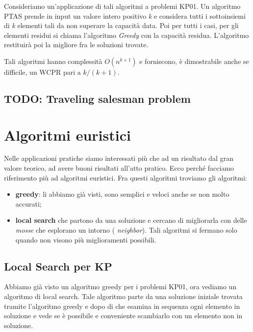 \documentclass[11pt, oneside]{book}
\begin{document}
\par\bigskip

Consideriamo un'applicazione di tali algoritmi a problemi KP01. Un
algoritmo PTAS prende in input un valore intero positivo {\em k} e
considera tutti i sottoinsiemi di {\em k} elementi tali da non
superare la capacit\`a data. Poi per tutti i casi, per gli elementi
residui si chiama l'algoritmo {\em Greedy} con la capacit\`a
residua. L'algoritmo restituir\`a poi la migliore fra le soluzioni
trovate.

\par\bigskip

Tali algoritmi hanno complessit\`a $O(n^{k+1})$ e forniscono, \`e
dimostrabile anche se difficile, un WCPR pari a $k/(k+1)$.
 
\subsection*{TODO: Traveling salesman problem}

\section{Algoritmi euristici}

Nelle applicazioni pratiche siamo interessati pi\`u che ad un
risultato dal gran valore teorico, ad avere buoni risultati all'atto
pratico. Ecco perch\'e facciamo riferimento pi\`u ad algoritmi
euristici. Fra questi algoritmi troviamo gli algoritmi:

\begin{itemize}

\item {\bf greedy}: li abbiamo gi\`a visti, sono semplici e veloci
  anche se non molto accurati;
  
\item {\bf local search} che partono da una soluzione e cercano di
  migliorarla con delle {\em mosse} che esplorano un intorno ({\em
    neighbor}). Tali algoritmi si fermano solo quando non visono pi\`u
  miglioramenti possibili.

\end{itemize}

\subsection{Local Search per KP}

Abbiamo gi\`a visto un algoritmo greedy per i problemi KP01, ora
vediamo un algoritmo di local search. Tale algoritmo parte da una
soluzione iniziale trovata tramite l'algoritmo greedy e dopo di che
esamina in sequenza ogni elemento in soluzione e vede se \`e possibile
e conveniente scambiarlo con un elemento non in soluzione.
\end{document}
